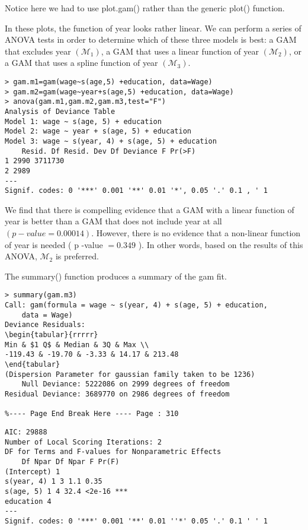 \documentclass[10pt]{article}
\begin{document}
Notice here we had to use plot.gam() rather than the generic plot() function.

In these plots, the function of year looks rather linear. We can perform a series of ANOVA tests in order to determine which of these three models is best: a GAM that excludes year $\left(\mathcal{M}_{1}\right)$, a GAM that uses a linear function of year $\left(\mathcal{M}_{2}\right)$, or a GAM that uses a spline function of year $\left(\mathcal{M}_{3}\right)$.

\begin{verbatim}
> gam.m1=gam(wage~s(age,5) +education, data=Wage)
> gam.m2=gam(wage~year+s(age,5) +education, data=Wage)
> anova(gam.m1,gam.m2,gam.m3,test="F")
Analysis of Deviance Table
Model 1: wage ~ s(age, 5) + education
Model 2: wage ~ year + s(age, 5) + education
Model 3: wage ~ s(year, 4) + s(age, 5) + education
    Resid. Df Resid. Dev Df Deviance F Pr(>F)
1 2990 3711730
2 2989
---
Signif. codes: 0 '***' 0.001 '**' 0.01 '*', 0.05 '.' 0.1 , ' 1
\end{verbatim}

We find that there is compelling evidence that a GAM with a linear function of year is better than a GAM that does not include year at all $(p-v a l u e=0.00014)$. However, there is no evidence that a non-linear function of year is needed ( p -value $=0.349$ ). In other words, based on the results of this ANOVA, $\mathcal{M}_{2}$ is preferred.

The summary() function produces a summary of the gam fit.

\begin{verbatim}
> summary(gam.m3)
Call: gam(formula = wage ~ s(year, 4) + s(age, 5) + education,
    data = Wage)
Deviance Residuals:
\begin{tabular}{rrrrr} 
Min & $1 Q$ & Median & 3Q & Max \\
-119.43 & -19.70 & -3.33 & 14.17 & 213.48
\end{tabular}
(Dispersion Parameter for gaussian family taken to be 1236)
    Null Deviance: 5222086 on 2999 degrees of freedom
Residual Deviance: 3689770 on 2986 degrees of freedom

%---- Page End Break Here ---- Page : 310
\end{verbatim}

\begin{verbatim}
AIC: 29888
Number of Local Scoring Iterations: 2
DF for Terms and F-values for Nonparametric Effects
    Df Npar Df Npar F Pr(F)
(Intercept) 1
s(year, 4) 1 3 1.1 0.35
s(age, 5) 1 4 32.4 <2e-16 ***
education 4
---
Signif. codes: 0 '***' 0.001 '**' 0.01 ''*' 0.05 '.' 0.1 ' ' 1
\end{verbatim}
\end{document}
